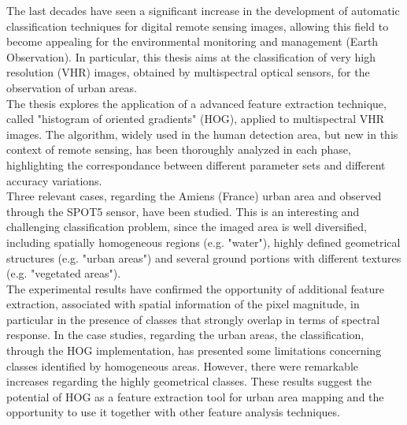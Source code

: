 
\english
\sommario
{}
The last decades have seen a significant increase in the development of automatic classification techniques for digital remote sensing images, allowing this field to become appealing for the environmental monitoring and management (Earth Observation). In particular, this thesis aims at the classification of very high resolution (VHR) images, obtained by multispectral optical sensors, for the observation of urban areas.\\
The thesis explores the application of a advanced feature extraction technique, called "histogram of oriented gradients" (HOG), applied to multispectral VHR images. The algorithm, widely used in the human detection area, but new in this context of remote sensing, has been thoroughly analyzed in each phase, highlighting the correspondance between different parameter sets and different accuracy variations. \\
Three relevant cases, regarding the Amiens (France) urban area and observed through the SPOT5 sensor, have been studied.
This is an interesting and challenging classification problem, since the imaged area is well diversified, including spatially homogeneous regions (e.g. "water"), highly defined geometrical structures (e.g. "urban areas") and several ground portions with different textures (e.g. "vegetated areas").\\
The experimental results have confirmed the opportunity of additional feature extraction, associated with spatial information of the pixel magnitude, in particular in the presence of classes that strongly overlap in terms of spectral response. In the case studies, regarding the urban areas, the classification, through the HOG implementation, has presented some limitations concerning classes identified by homogeneous areas. However, there were remarkable increases regarding the highly geometrical classes.
These results suggest the potential of HOG as a feature extraction tool for urban area mapping and the opportunity to use it together with other feature analysis techniques.


